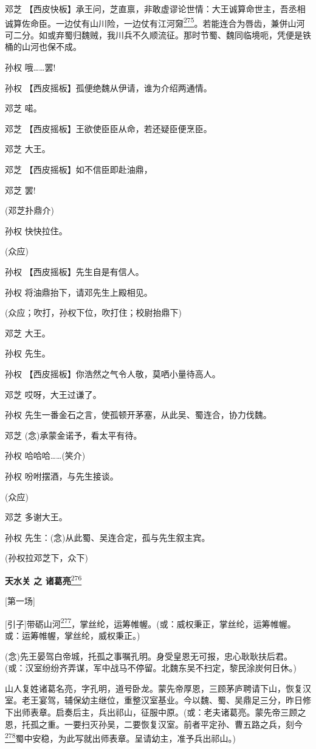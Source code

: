 邓芝
【西皮快板】承王问，芝直禀，非敢虚谬论世情：大王诚算命世主，吾丞相诚算佐命臣。一边仗有山川险，一边仗有江河奫\protect\hyperlink{fn275}{\textsuperscript{275}}。若能连合为唇齿，兼併山河可二分。如或弃蜀归魏贼，我川兵不久顺流征。那时节蜀、魏同临境呃，凭便是铁桶的山河也保不成。

孙权 哦\ldots{}\ldots{}罢!

孙权 【西皮摇板】孤便绝魏从伊请，谁为介绍两通情。

邓芝 喏。

邓芝 【西皮摇板】王欲使臣臣从命，若还疑臣便烹臣。

邓芝 大王。

邓芝 【西皮摇板】如不信臣即赴油鼎，

邓芝 罢!

(邓芝扑鼎介)

孙权 快快拉住。

(众应)

孙权 【西皮摇板】先生自是有信人。

孙权 将油鼎抬下，请邓先生上殿相见。

(众应；吹打，孙权下位，吹打住；校尉抬鼎下)

邓芝 大王。

孙权 先生。

孙权 【西皮摇板】你浩然之气令人敬，莫哂小量待高人。

邓芝 哎呀，大王过谦了。

孙权 先生一番金石之言，使孤顿开茅塞，从此吴、蜀连合，协力伐魏。

邓芝 (念)承蒙金诺予，看太平有待。

孙权 哈哈哈\ldots{}\ldots{}(笑介)

孙权 吩咐摆酒，与先生接谈。

(众应)

邓芝 多谢大王。

孙权 先生：(念)从此蜀、吴连合定，孤与先生叙主宾。

(孙权拉邓芝下，众下)

\textbf{天水关 之
诸葛亮}\protect\hyperlink{fn276}{\textsuperscript{276}}

{[}第一场{]}

{[}引子{]}带砺山河\protect\hyperlink{fn277}{\textsuperscript{277}}，掌丝纶，运筹帷幄。(或：威权秉正，掌丝纶，运筹帷幄。或：运筹帷幄，掌丝纶，威权秉正。)

(念)先王晏驾白帝城，托孤之事嘱孔明。身受皇恩无可报，忠心耿耿扶后君。(或：汉室纷纷齐弄谋，军中战马不停留。北魏东吴不扫定，黎民涂炭何日休。)

山人复姓诸葛名亮，字孔明，道号卧龙。蒙先帝厚恩，三顾茅庐聘请下山，恢复汉室。老王宴驾，辅保幼主继位，重整汉室基业。今以魏、蜀、吴鼎足三分，昨日修下出师表章。启奏后主，兵出祁山，征服中原。(或：老夫诸葛亮。蒙先帝三顾之恩，托孤之重。一要扫灭孙吴，二要恢复汉室。前者平定孙、曹五路之兵，刻今\protect\hyperlink{fn278}{\textsuperscript{278}}蜀中安稳，为此写就出师表章。呈请幼主，准予兵出祁山。)

